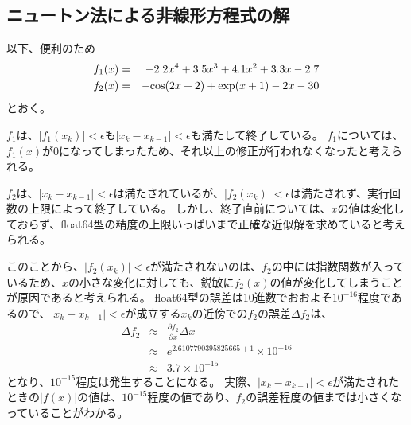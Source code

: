 \documentclass[11pt]{ltjsarticle}
\begin{document}
\subsection{ニュートン法による非線形方程式の解}
	以下、便利のため
	\begin{eqnarray*}
       f_1(x) & = & - 2.2 x^4 + 3.5x^3 + 4.1x^2 + 3.3x - 2.7 \\
       f_2(x) & = & - {\rm cos}(2x+2) + {\rm exp}(x+1) - 2x -30
	\end{eqnarray*}
	とおく。

	$f_1$は、$|f_1(x_{k})| < \epsilon$も$|x_{k} - x_{k-1}| < \epsilon$も満たして終了している。
	$f_1$については、$f_1(x)$が$0$になってしまったため、それ以上の修正が行われなくなったと考えられる。

	$f_2$は、$|x_{k} - x_{k-1}| < \epsilon$は満たされているが、$|f_2(x_{k})| < \epsilon$は満たされず、実行回数の上限によって終了している。
	しかし、終了直前については、$x$の値は変化しておらず、float64型の精度の上限いっぱいまで正確な近似解を求めていると考えられる。

	このことから、$|f_2(x_{k})| < \epsilon$が満たされないのは、$f_2$の中には指数関数が入っているため、$x$の小さな変化に対しても、鋭敏に$f_2(x)$の値が変化してしまうことが原因であると考えられる。
	float64型の誤差は10進数でおおよそ$10^{-16}$程度であるので、$|x_{k} - x_{k-1}| < \epsilon$が成立する$x_{k}$の近傍での$f_2$の誤差$\Delta f_2$は、
	\begin{eqnarray*}
		\Delta f_2 & \approx & \frac{\partial f_2}{\partial x} \Delta x \\
				   & \approx & e^{2.6107790395825665+1} \times 10^{-16} \\
				   & \approx & 3.7 \times 10^{-15}
	\end{eqnarray*}
	となり、$10^{-15}$程度は発生することになる。
	実際、$|x_{k} - x_{k-1}| < \epsilon$が満たされたときの$|f(x)|$の値は、$10^{-15}$程度の値であり、$f_2$の誤差程度の値までは小さくなっていることがわかる。
\end{document}
